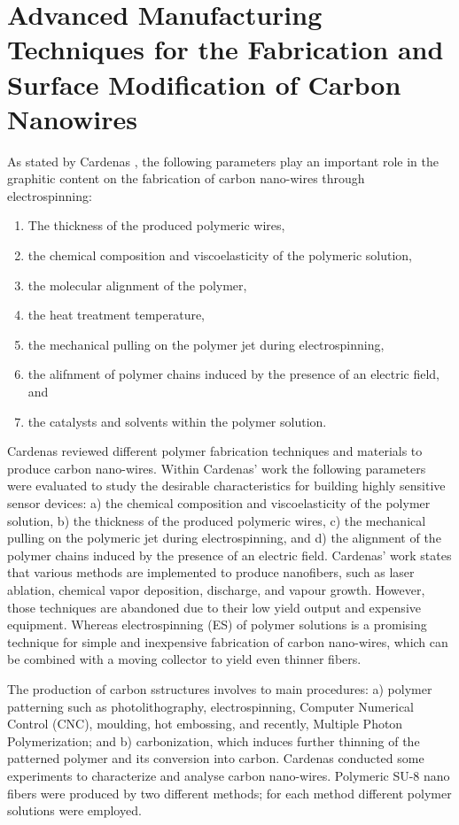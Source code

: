 \clearpage

\section{Advanced Manufacturing Techniques for the Fabrication and Surface Modification of Carbon Nanowires \cite{Cardenas2017}}

As stated by Cardenas \cite{Cardenas2017}, the following parameters play an important role in the graphitic content on the fabrication of carbon nano-wires through electrospinning:

\begin{enumerate}
\item The thickness of the produced polymeric wires,
\item the chemical composition and viscoelasticity of the polymeric solution,
\item the molecular alignment of the polymer,
\item the heat treatment temperature,
\item the mechanical pulling on the polymer jet during electrospinning,
\item the alifnment of polymer chains induced by the presence of an electric field, and
\item the catalysts and solvents within the polymer solution.
\end{enumerate}

Cardenas reviewed different polymer fabrication techniques and materials to produce carbon nano-wires. Within Cardenas' work the following parameters were evaluated to study the desirable characteristics for building highly sensitive sensor devices: a) the chemical composition and viscoelasticity of the polymer solution, b) the thickness of the produced polymeric wires, c) the mechanical pulling on the polymeric jet during electrospinning, and d) the alignment of the polymer chains induced by the presence of an electric field. Cardenas' work states that various methods are implemented to produce nanofibers, such as laser ablation, chemical vapor deposition, discharge, and vapour growth. However, those techniques are abandoned due to their low yield output and expensive equipment. Whereas electrospinning (ES) of polymer solutions is a promising technique for simple and inexpensive fabrication of carbon nano-wires, which can be combined with a moving collector to yield even thinner fibers.

The production of carbon sstructures involves to main procedures: a) polymer patterning such as photolithography, electrospinning, Computer Numerical Control (CNC), moulding, hot embossing, and recently, Multiple Photon Polymerization; and b) carbonization, which induces further thinning of the patterned polymer and its conversion into carbon. Cardenas conducted some experiments to characterize and analyse carbon nano-wires. Polymeric SU-8 nano fibers were produced by two different methods; for each method different polymer solutions were employed.

